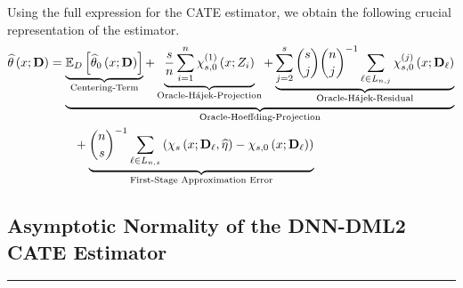 Using the full expression for the CATE estimator, we obtain the following crucial representation of the estimator.
\begin{equation}\label{eq:DNNDML2_Decomp}
    \begin{aligned}
        \widehat{\theta}\left(x; \mathbf{D}\right)
        & = \underbrace{\underbrace{\mathbb{E}_{D}\left[\widehat{\theta}_{0}\left(x; \mathbf{D}\right)\right]}_{\text{Centering-Term}}
        + \underbrace{\frac{s}{n}\sum_{i = 1}^{n} \chi_{s,0}^{(1)}\left(x; Z_{i}\right)}_{\text{Oracle-H\'ajek-Projection}}
        + \underbrace{\sum_{j = 2}^{s} \binom{s}{j} \binom{n}{j}^{-1}\sum_{\ell \in L_{n,j}} \chi_{s,0}^{(j)}\left(x; \mathbf{D}_{\ell}\right)}_{\text{Oracle-H\'ajek-Residual}}}_{\text{Oracle-Hoeffding-Projection}}\\
        & \quad \quad + \underbrace{\binom{n}{s}^{-1}\sum_{\ell \in L_{n,s}}\left(\chi_{s}\left(x; \mathbf{D}_{\ell}, \widehat{\eta}\right) - \chi_{s,0}\left(x; \mathbf{D}_{\ell}\right)\right)}_{\text{First-Stage Approximation Error}}
    \end{aligned}
\end{equation}

\subsection{Asymptotic Normality of the DNN-DML2 CATE Estimator}\label{CATE_AsympNorm}
\hrule

